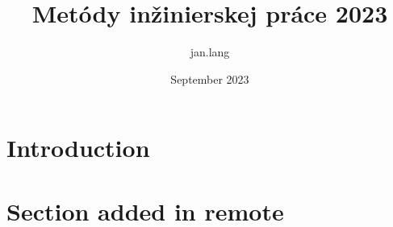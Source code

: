 \documentclass{article}
\title{Metódy inžinierskej práce 2023}
\author{jan.lang }
\date{September 2023}
\begin{document}
\maketitle

\section{Introduction}
\section{Section added in remote}

\Blinddocument
\end{document}
